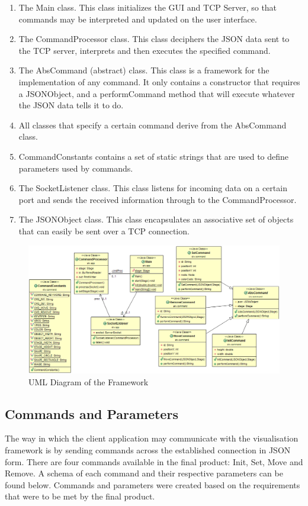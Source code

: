 \documentclass[11pt,a4paper]{article}
\begin{document}
\begin{enumerate}
\item The Main class. This class initializes the GUI and TCP Server, so that commands may be interpreted and updated on the user interface.
\item The CommandProcessor class. This class deciphers the JSON data sent to the TCP server, interprets and then executes the specified command.
\item The AbsCommand (abstract) class. This class is a framework for the implementation of any command. It only contains a constructor that requires a JSONObject, and a performCommand method that will execute whatever the JSON data tells it to do.
\item All classes that specify a certain command derive from the AbsCommand class.
\item CommandConstants contains a set of static strings that are used to define parameters used by commands.
\item The SocketListener class. This class listens for incoming data on a certain port and sends the received information through to the CommandProcessor.
\item The JSONObject class. This class encapsulates an associative set of objects that can easily be sent over a TCP connection.
\end{enumerate}


\begin{figure}[ht!]
	\centering
		\includegraphics[width=\textwidth]{uml}
	\caption{UML Diagram of the Framework}
\end{figure}

\subsection{Commands and Parameters}

The way in which the client application may communicate with the visualisation framework is by sending commands across the established connection in JSON form. There are four commands available in the final product: Init, Set, Move and Remove. A schema of each command and their respective parameters can be found below. Commands and parameters were created based on the requirements that were to be met by the final product. 
\end{document}
